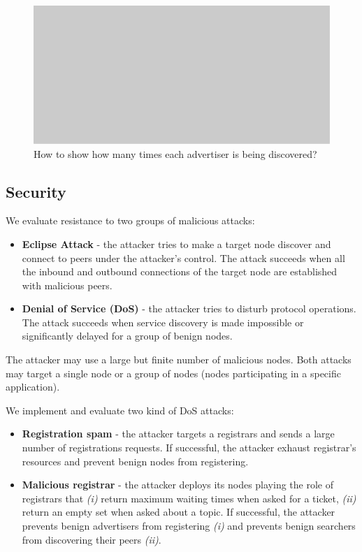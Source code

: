 \begin{figure}[!h]
\includegraphics[width=\linewidth]{img/placeholder}
\caption{How to show how many times each advertiser is being discovered?} 
\label{fig:params_b}
\end{figure}
\fi

\subsection{Security}
We evaluate \sysname resistance to two groups of malicious attacks:
\begin{itemize}
    \item \textbf{Eclipse Attack} - the attacker tries to make a target node discover and connect to peers under the attacker's control. The attack succeeds when all the inbound and outbound connections of the target node are established with malicious peers. 
    \item \textbf{Denial of Service (DoS)} - the attacker tries to disturb protocol operations. The attack succeeds when service discovery is made impossible or significantly delayed for a group of benign nodes.  
\end{itemize}
The attacker may use a large but finite number of malicious nodes. Both attacks may target a single node or a group of nodes (\eg nodes participating in a specific application). 


We implement and evaluate two kind of DoS attacks:
\begin{itemize}
    \item \textbf{Registration spam} - the attacker targets a registrars and sends a large number of registrations requests. If successful, the attacker exhaust registrar's resources and prevent benign nodes from registering. 
    \item \textbf{Malicious registrar} - the attacker deploys its nodes playing the role of registrars that \textit{(i)} return maximum waiting times when asked for a ticket, \textit{(ii)} return an empty set when asked about a topic. If successful, the attacker prevents benign advertisers from registering \textit{(i)} and prevents benign searchers from discovering their peers \textit{(ii)}. 
\end{itemize}

